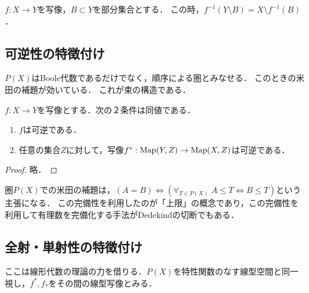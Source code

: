 \documentclass[uplatex,dvipdfmx]{jsreport}
\begin{document}
\begin{proposition}[逆像は補集合を保つ]
    $f:X\to Y$を写像，$B\subset Y$を部分集合とする．
    この時，$f^{-1}(Y\setminus B)=X\setminus f^{-1}(B)$．
\end{proposition}

\subsection{可逆性の特徴付け}

\begin{tcolorbox}[colframe=ForestGreen, colback=ForestGreen!10!white,breakable,colbacktitle=ForestGreen!40!white,coltitle=black,fonttitle=\bfseries\sffamily,
title=]
    $P(X)$はBoole代数であるだけでなく，順序による圏とみなせる．
    このときの米田の補題が効いている．
    これが束の構造である．
\end{tcolorbox}

\begin{proposition}
    $f:X\to Y$を写像とする．次の２条件は同値である．
    \begin{enumerate}
        \item $f$は可逆である．
        \item 任意の集合$Z$に対して，写像$f^*:\mathrm{Map}(Y,Z)\to\mathrm{Map}(X,Z)$は可逆である．
    \end{enumerate}
\end{proposition}
\begin{proof}
    略．
\end{proof}

\begin{remarks}
    圏$P(X)$での米田の補題は，$(A=B)\Leftrightarrow(\forall_{T\in P(X)}\;A\le T\Leftrightarrow B\le T)$という主張になる．
    この完備性を利用したのが「上限」の概念であり，この完備性を利用して有理数を完備化する手法がDedekindの切断でもある．
\end{remarks}

\subsection{全射・単射性の特徴付け}

\begin{tcolorbox}[colframe=ForestGreen, colback=ForestGreen!10!white,breakable,colbacktitle=ForestGreen!40!white,coltitle=black,fonttitle=\bfseries\sffamily,
title=]
    ここは線形代数の理論の力を借りる．$P(X)$を特性関数のなす線型空間と同一視し，$f^*,f_*$をその間の線型写像とみる．
\end{tcolorbox}
\end{document}
